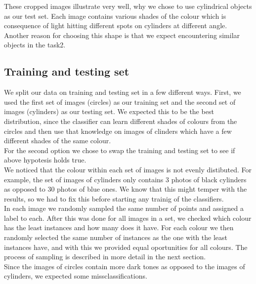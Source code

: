 \documentclass[12pt,a4paper]{article}
\begin{document}
	These cropped images illustrate very well, why we chose to use cylindrical objects as our test set. Each image contains various shades of the colour which is consequence of light hitting different spots on cylinders at different angle. Another reason for choosing this shape is that we expect encountering similar objects in the task2. 

	\subsection{Training and testing set}

	We split our data on training and testing set in a few different ways. First, we used the first set of images (circles) as our training set and the second set of images (cylinders) as our testing set. We expected this to be the best distribution, since the classifier can learn different shades of colours from the circles and then use that knowledge on images of clinders which have a few different shades of the same colour. \\

	For the second option we chose to swap the training and testing set to see if above hypotesis holds true.\\

	We noticed that the colour within each set of images is not evenly distibuted. For example, the set of images of cylinders only contains 3 photos of black cylinders as opposed to 30 photos of blue ones. We know that this might temper with the results, so we had to fix this before starting any trainig of the classifiers. \\
	
	In each image we randomly sampled the same number of points and assigned a label to each. After this was done for all images in a set, we checked which colour has the least instances and how many does it have. For each colour we then randomly selected the same number of instances as the one with the least instances have, and with this we provided equal oportunities for all colours. The process of sampling is described in more detail in the next section. \\

	Since the images of circles contain more dark tones as opposed to the images of cylinders, we expected some missclassifications.
	
\end{document}
